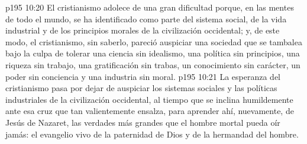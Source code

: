 \vs p195 10:20 El cristianismo adolece de una gran dificultad porque, en las mentes de todo el mundo, se ha identificado como parte del sistema social, de la vida industrial y de los principios morales de la civilización occidental; y, de este modo, el cristianismo, sin saberlo, pareció auspiciar una sociedad que se tambalea bajo la culpa de tolerar una ciencia sin idealismo, una política sin principios, una riqueza sin trabajo, una gratificación sin trabas, un conocimiento sin carácter, un poder sin conciencia y una industria sin moral.
\vs p195 10:21 La esperanza del cristianismo pasa por dejar de auspiciar los sistemas sociales y las políticas industriales de la civilización occidental, al tiempo que se inclina humildemente ante esa cruz que tan valientemente ensalza, para aprender ahí, nuevamente, de Jesús de Nazaret, las verdades más grandes que el hombre mortal pueda oír jamás: el evangelio vivo de la paternidad de Dios y de la hermandad del hombre.
